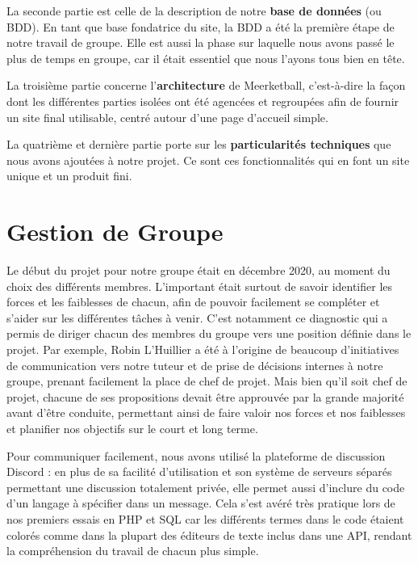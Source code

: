 \documentclass[12pt]{report}
\begin{document}
	    \bigskip
	    \par
	    La seconde partie est celle de la description de notre \textbf{base de données} (ou BDD). En tant que base fondatrice du site, la BDD a été la première étape de notre travail de groupe. Elle est aussi la phase sur laquelle nous avons passé le plus de temps en groupe, car il était essentiel que nous l’ayons tous bien en tête.
		    
	    \bigskip
	    \par
        La troisième partie concerne l’\textbf{architecture} de Meerketball, c’est-à-dire la façon dont les différentes parties isolées ont été agencées et regroupées afin de fournir un site final utilisable, centré autour d’une page d’accueil simple.
		    
        \bigskip
        \par
        La quatrième et dernière partie porte sur les \textbf{particularités techniques} que nous avons ajoutées à notre projet. Ce sont ces fonctionnalités qui en font un site unique et un produit fini.

        \chapter{Gestion de Groupe}
        \par
        Le début du projet pour notre groupe était en décembre 2020, au moment du choix des différents membres. L’important était surtout de savoir identifier les forces et les faiblesses de chacun, afin de pouvoir facilement se compléter et s’aider sur les différentes tâches à venir. C’est notamment ce diagnostic qui a permis de diriger chacun des membres du groupe vers une position définie dans le projet. Par exemple, Robin L’Huillier a été à l’origine de beaucoup d’initiatives de communication vers notre tuteur et de prise de décisions internes à notre groupe, prenant facilement la place de chef de projet. Mais bien qu’il soit chef de projet, chacune de ses propositions devait être approuvée par la grande majorité avant d’être conduite, permettant ainsi de faire valoir nos forces et nos faiblesses et planifier nos objectifs sur le court et long terme.
        
        \bigskip
        \par
        Pour communiquer facilement, nous avons utilisé la plateforme de discussion Discord : en plus de sa facilité d’utilisation et son système de serveurs séparés permettant une discussion totalement privée, elle permet aussi d’inclure du code d’un langage à spécifier dans un message. Cela s’est avéré très pratique lors de nos premiers essais en PHP et SQL car les différents termes dans le code étaient colorés comme dans la plupart des éditeurs de texte inclus dans une API, rendant la compréhension du travail de chacun plus simple.
        
\end{document}
